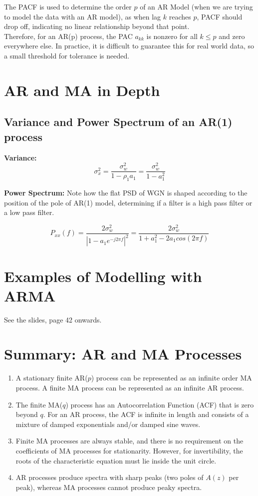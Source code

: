 The PACF is used to determine the order $p$ of an AR Model (when we are trying to model the data with an AR model), as when lag $k$ reaches $p$, PACF should drop off, indicating no linear relationship beyond that point.\\

Therefore, for an AR(p) process, the PAC $a_{kk}$ is nonzero for all $k \leq p$ and zero everywhere else. In practice, it is difficult to guarantee this for real world data, so a small threshold for tolerance is needed.

\section{AR and MA in Depth}
\subsection{Variance and Power Spectrum of an AR(1) process}
\textbf{Variance:}
\begin{equation}
    \sigma_x^2=\frac{\sigma_w^2}{1-\rho_1a_1}=\frac{\sigma_w^2}{1-a_1^2}
\end{equation}


\textbf{Power Spectrum:}
Note how the flat PSD of WGN is shaped according to the position of the pole of AR(1) model, determining if a filter is a high pass filter or a low pass filter.

\begin{equation}
    P_{xx}(f)=\frac{2\sigma_w^2}{\left|1-a_1e^{-j2\pi f}\right|^2}=\frac{2\sigma_w^2}{1+a_1^2-2a_1cos(2\pi f)}
\end{equation}


\section{Examples of Modelling with ARMA}
See the slides, page 42 onwards.


\section{Summary: AR and MA Processes}
\begin{enumerate}
    \item A stationary finite AR(\(p\)) process can be represented as an infinite order MA process. A finite MA process can be represented as an infinite AR process.
    \item The finite MA(\(q\)) process has an Autocorrelation Function (ACF) that is zero beyond \(q\). For an AR process, the ACF is infinite in length and consists of a mixture of damped exponentials and/or damped sine waves.
    \item Finite MA processes are always stable, and there is no requirement on the coefficients of MA processes for stationarity. However, for invertibility, the roots of the characteristic equation must lie inside the unit circle.
    \item AR processes produce spectra with sharp peaks (two poles of \(A(z)\) per peak), whereas MA processes cannot produce peaky spectra.
\end{enumerate}

